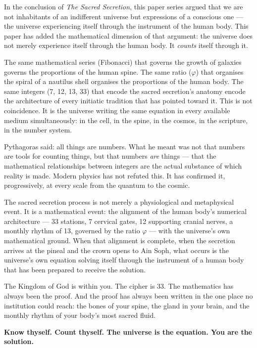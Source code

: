 \documentclass[12pt, a4paper]{article}
\begin{document}
In the conclusion of \emph{The Sacred Secretion}, this paper series argued that
we are not inhabitants of an indifferent universe but expressions of a
conscious one — the universe experiencing itself through the instrument of the
human body. This paper has added the mathematical dimension of that argument:
the universe does not merely experience itself through the human body. It
\emph{counts} itself through it.

The same mathematical series (Fibonacci) that governs the growth of galaxies
governs the proportions of the human spine. The same ratio ($\varphi$) that
organises the spiral of a nautilus shell organises the proportions of the human
body. The same integers (7, 12, 13, 33) that encode the sacred secretion's
anatomy encode the architecture of every initiatic tradition that has pointed
toward it. This is not coincidence. It is the universe writing the same
equation in every available medium simultaneously: in the cell, in the spine,
in the cosmos, in the scripture, in the number system.

Pythagoras said: all things are numbers. What he meant was not that numbers are
tools for counting things, but that numbers \emph{are} things — that the
mathematical relationships between integers are the actual substance of which
reality is made. Modern physics has not refuted this. It has confirmed it,
progressively, at every scale from the quantum to the cosmic.

The sacred secretion process is not merely a physiological and metaphysical
event. It is a mathematical event: the alignment of the human body's numerical
architecture — 33 stations, 7 cervical gates, 12 supporting cranial nerves,
a monthly rhythm of 13, governed by the ratio $\varphi$ — with the universe's
own mathematical ground. When that alignment is complete, when the secretion
arrives at the pineal and the crown opens to Ain Soph, what occurs is the
universe's own equation solving itself through the instrument of a human body
that has been prepared to receive the solution.

The Kingdom of God is within you. The cipher is 33. The mathematics has always
been the proof. And the proof has always been written in the one place no
institution could reach: the bones of your spine, the gland in your brain, and
the monthly rhythm of your body's most sacred fluid.

\vspace{1.5em}
\noindent\textbf{Know thyself. Count thyself. The universe is the equation.
You are the solution.}

\newpage
\printbibliography[title={Bibliography}]
\end{document}
